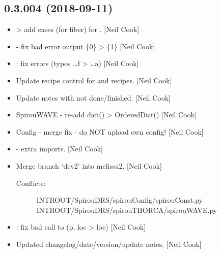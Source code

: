\documentclass[a4paper,10pt,english]{report}
\begin{document}
\subsection{0.3.004 (2018-09-11)}
\label{\detokenize{misc/changelog:id331}}\begin{itemize}
\item {} 
 \textendash{}\textgreater{} add cases (for fiber) for .
{[}Neil Cook{]}

\item {} 
 - fix bad error output \{0\} \textendash{}\textgreater{} \{1\} {[}Neil Cook{]}

\item {} 
: fix errors (typos …f \textendash{}\textgreater{} …a) {[}Neil Cook{]}

\item {} 
Update recipe control for  and  recipes. {[}Neil Cook{]}

\item {} 
Update notes with not done/finished. {[}Neil Cook{]}

\item {} 
SpirouWAVE - re-add dict() \textendash{}\textgreater{} OrderedDict() {[}Neil Cook{]}

\item {} 
Config - merge fix - do NOT upload own config! {[}Neil Cook{]}

\item {} 
 - extra imports. {[}Neil Cook{]}

\item {} 
Merge branch ‘dev2’ into melissa2. {[}Neil Cook{]}
\begin{description}
\item[{Conflicts:}] \leavevmode
{}
INTROOT/SpirouDRS/spirouConfig/spirouConst.py
INTROOT/SpirouDRS/spirouTHORCA/spirouWAVE.py

\end{description}

\item {} 
: fix bad call to  (p, loc \textendash{}\textgreater{} loc)
{[}Neil Cook{]}

\item {} 
Updated changelog/date/version/update notes. {[}Neil Cook{]}


\end{itemize}
\end{document}
